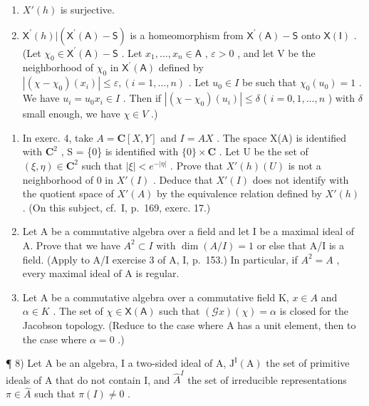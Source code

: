 \begin{enumerate}
\def\labelenumi{\alph{enumi})}
\item
  \(X'(h)\) is surjective.
\item
  \(\mathsf{X}^{\prime}(h)|(\mathsf{X}^{\prime}(\mathsf{A})-\mathsf{S})\) is a homeomorphism from \(\mathsf{X}^{\prime}(\mathsf{A})-\mathsf{S}\) onto \(\mathsf{X}(\mathsf{I})\) . (Let \(\chi_{0}\in\mathsf{X}^{\prime}(\mathsf{A})-\mathsf{S}\) . Let \(x_{1},\ldots,x_{n}\in\mathsf{A}\) , \(\varepsilon>0\) , and let V be the neighborhood of \(\chi_{0}\) in \(\mathsf{X}^{\prime}(\mathsf{A})\) defined by \(|(\chi-\chi_{0})(x_{i})|\leqslant\varepsilon,(i=1,\ldots,n)\) . Let \(u_{0}\in I\) be such that \(\chi_0(u_0) = 1\) . We have \(u_i = u_0x_i \in I\) . Then if \(|(\chi - \chi_0)(u_i)| \leqslant \delta\) ( \(i = 0, 1, \ldots, n\) ) with \(\delta\) small enough, we have \(\chi \in V\) .)
\end{enumerate}

\begin{enumerate}
\def\labelenumi{\arabic{enumi})}
\setcounter{enumi}{4}
\item
  In exerc. 4, take \(A = \mathbf{C}[X,Y]\) and \(I = AX\) . The space X(A) is identified with \(\mathbf{C}^2\) , S = \{0\} is identified with \(\{0\} \times \mathbf{C}\) . Let U be the set of \((\xi, \eta) \in \mathbf{C}^2\) such that \(|\xi| < e^{-|\eta|}\) . Prove that \(X'(h)(U)\) is not a neighborhood of 0 in \(X'(I)\) . Deduce that \(X'(I)\) does not identify with the quotient space of \(X'(A)\) by the equivalence relation defined by \(X'(h)\) . (On this subject, cf.~I, p.~169, exerc. 17.)
\item
  Let A be a commutative algebra over a field and let I be a maximal ideal of A. Prove that we have \(A^{2} \subset I\) with \(\dim(A/I) = 1\) or else that A/I is a field. (Apply to A/I exercise 3 of A, I, p.~153.) In particular, if \(A^{2} = A\) , every maximal ideal of A is regular.
\item
  Let A be a commutative algebra over a commutative field K, \(x \in A\) and \(\alpha \in K\) . The set of \(\chi \in \mathsf{X}(\mathsf{A})\) such that \((\mathcal{G}x)(\chi) = \alpha\) is closed for the Jacobson topology. (Reduce to the case where A has a unit element, then to the case where \(\alpha = 0\) .)
\end{enumerate}

¶ 8) Let A be an algebra, I a two-sided ideal of A, \(\mathrm{J}^{\mathrm{I}}(\mathrm{A})\) the set of primitive ideals of A that do not contain I, and \(\widehat{A}^{I}\) the set of irreducible representations \(\pi \in \widehat{A}\) such that \(\pi(I) \neq 0\) .

